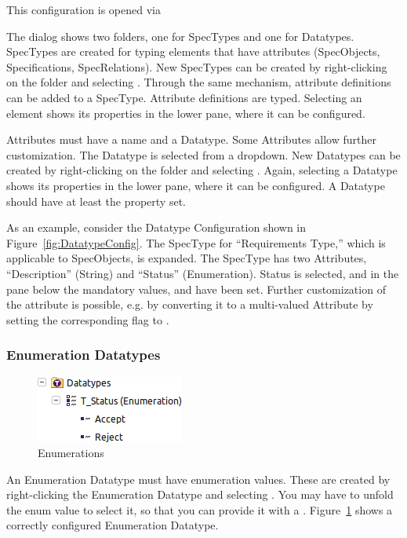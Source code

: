 This configuration is opened via 

The dialog shows two folders, one for SpecTypes and one for Datatypes.
SpecTypes are created for typing elements that have attributes
(SpecObjects, Specifications, SpecRelations).  New SpecTypes can be
created by right-clicking on the folder and selecting .
Through the same mechanism, attribute definitions can be added to a
SpecType.  Attribute definitions are typed.  Selecting an element shows
its properties in the lower pane, where it can be configured.

Attributes must have a name and a Datatype.  Some Attributes
allow further customization.  The Datatype is selected from a
dropdown.  New Datatypes can be created by right-clicking on the folder
 and selecting .  Again, selecting a Datatype
shows its properties in the lower pane, where it can be configured.  A
Datatype should have at least the  property set.

As an example, consider the Datatype Configuration shown in Figure~\ref{fig:DatatypeConfig}.
The SpecType for ``Requirements Type,'' which is applicable to
SpecObjects, is expanded.  The SpecType has two Attributes,
``Description'' (String) and ``Status'' (Enumeration).  Status is
selected, and in the pane below the mandatory values,  and
 have been set.  Further customization of the attribute is
possible, e.g.  by converting it to a multi-valued Attribute by setting
the corresponding flag to .

\subsubsection{Enumeration Datatypes}

\begin{figure}
\centering      
\includegraphics[width=0.3\linewidth]{../rmf-images/rmf_enumeration.png}
\caption{Enumerations}      
\label{fig:Enumerations}
\end{figure}

An Enumeration Datatype must have enumeration values.  These are created
by right-clicking the Enumeration Datatype and selecting .  You may have to unfold the enum value to select it, so that you can provide it with a .  Figure~\ref{fig:Enumerations} shows a correctly configured Enumeration Datatype.

